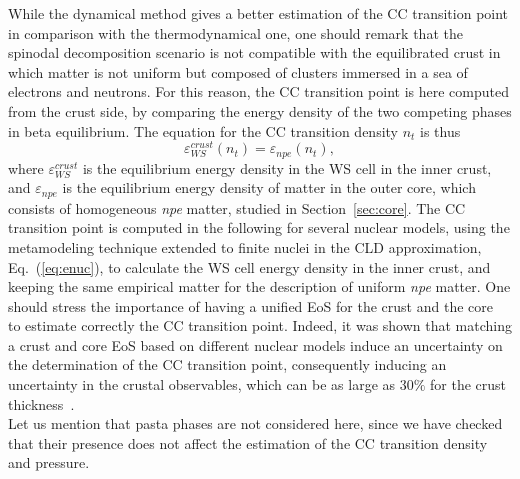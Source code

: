 While the dynamical method gives a better estimation of the CC transition point
in comparison with the thermodynamical one, one should remark that the spinodal
decomposition scenario is not compatible with the equilibrated crust in which
matter is not uniform but composed of clusters immersed in a sea of electrons
and neutrons. For this reason, the CC transition point is here computed from 
the crust side, by comparing the energy density of the two competing phases in 
beta equilibrium. The equation for the CC transition density $n_t$ is thus
%
\begin{equation}
  \varepsilon_{WS}^{crust}(n_t) = \varepsilon_{npe}(n_t),\label{eq:cctp}
\end{equation}
%
where $\varepsilon_{WS}^{crust}$ is the equilibrium energy density in the WS
cell in the inner crust, and $\varepsilon_{npe}$ is the equilibrium energy
density of matter in the outer core, which consists of homogeneous \textit{npe} 
matter, studied in Section~\ref{sec:core}.
The CC transition point is computed in the following for several nuclear 
models, using the metamodeling technique extended to finite nuclei in the 
CLD approximation, Eq.~(\ref{eq:enuc}), to calculate the WS cell energy density in 
the inner crust, and keeping the same empirical matter for the description of 
uniform \textit{npe} matter. One should stress the importance of having a 
unified EoS for the crust and the core~\cite{Douchin2001} to estimate correctly 
the CC transition point. Indeed, it was shown that matching a crust and core
EoS based on different nuclear models induce an uncertainty on the determination 
of the CC transition point, consequently inducing an uncertainty in the crustal 
observables, which can be as large as $30\%$ for the crust
thickness~\cite{Fortin2016}.\\
Let us mention that pasta phases are not 
considered here, since we have checked that their presence does not 
affect the estimation of the CC transition density and pressure.

